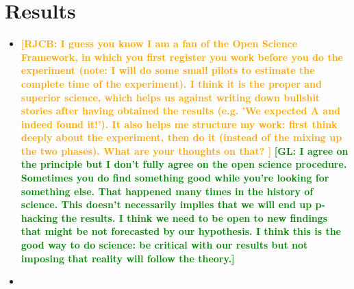 \documentclass{article}
\newcommand*\richel[1]{\textcolor{orange}{\textbf{[RJCB: #1]}}}
\newcommand*\gio[1]{\textcolor{green}{\textbf{[GL: #1]}}}
\begin{document}
\section{Results}
\begin{itemize}

\item
\richel{
  I guess you know I am a fan of the Open Science Framework,
  in which you first register you work before you do the experiment
  (note: I will do some small pilots to estimate the complete time
  of the experiment). I think it is the proper and superior science,
  which helps us against writing down bullshit stories after having
  obtained the results (e.g. 'We expected A and indeed found it!').
  It also helps me structure my work: first think
  deeply about the experiment, then do it (instead of the mixing
  up the two phases). What are your thoughts on that?
}
\gio{I agree on the principle but I don't fully agree on the open science procedure. Sometimes you do find something good while you're looking for something else. That happened many times in the history of science. This doesn't necessarily implies that we will end up p-hacking the results. I think we need to be open to new findings that might be not forecasted by our hypothesis. I think this is the good way to do science: be critical with our results but not imposing that reality will follow the theory.}
\item

\end{itemize}




\appendix


\end{document}

